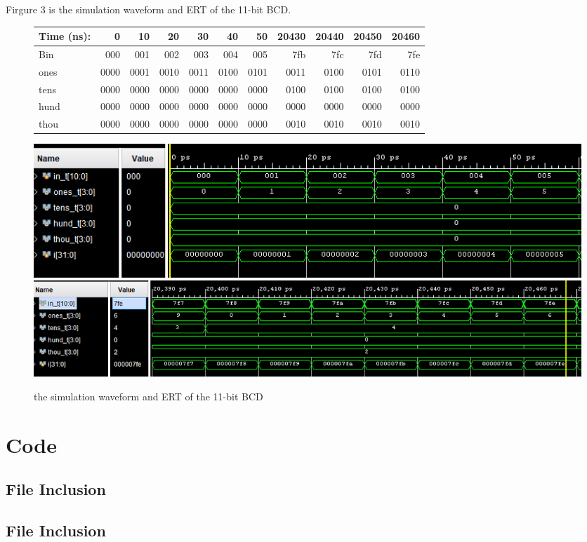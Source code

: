 \documentclass[11pt]{article}
\newcommand{\Verilog}[2][]{%
	
}
\begin{document}
Firgure 3 is the simulation waveform and ERT of the 11-bit BCD.\\
\begin{figure}[ht]\centering
	\begin{tabular}{l|rrrr|rrrr|rr}
		Time (ns): & 0 & 10 & 20 & 30 & 40 & 50 & 20430 & 20440 & 20450 & 20460 \\
		\midrule
		Bin & 000 & 001 & 002 & 003 & 004 & 005 & 7fb & 7fc & 7fd & 7fe \\
		\midrule
		ones & 0000 & 0001 & 0010 & 0011 & 0100 & 0101 & 0011 & 0100 & 0101 & 0110 \\
		tens & 0000 & 0000 & 0000 & 0000 & 0000 & 0000 & 0100 & 0100 & 0100 & 0100 \\
		hund & 0000 & 0000 & 0000 & 0000 & 0000 & 0000 & 0000 & 0000 & 0000 & 0000 \\
		thou & 0000 & 0000 & 0000 & 0000 & 0000 & 0000 & 0010 & 0010 & 0010 & 0010 \\
		\bottomrule
	\end{tabular}\medskip
	
	\includegraphics[width=1\textwidth]{bcd11_simulate_beginning}
	\includegraphics[width=1\textwidth]{bcd11_simulate_end}
	\caption{the simulation waveform and ERT of the 11-bit BCD}
	\label{fig:bcd11_simulate}
\end{figure}


\section*{Code}

\subsection*{File Inclusion}
\Verilog[caption=Add3 Verilog code,label=code:file_ex]{add3.sv}

\subsection*{File Inclusion}
\Verilog[caption=Add3 Test Benches Verilog code,label=code:file_ex]{add3_test.sv}
\end{document}
